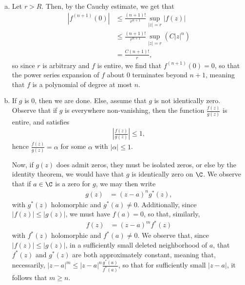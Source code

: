 \documentclass[10pt]{mypackage}
\begin{document}
\begin{solution}\hfill
  \begin{enumerate}[(a)]
    \item Let $r > R$. Then, by the Cauchy estimate, we get that
      \begin{align*}
        \left\vert f^{\left(n+1\right)}(0) \right\vert &\leq \frac{\left( n+1 \right)!}{r^{n+1}}\sup_{|z| = r} \left\vert f(z) \right\vert\\
                                                       &\leq \frac{\left( n+1 \right)!}{r^{n+1}} \sup_{|z| = r} \left( C \left\vert z \right\vert^{n} \right)\\
                                                       &= \frac{C\left( n+1 \right)!}{r},
      \end{align*}
      so since $r$ is arbitrary and $f$ is entire, we find that $ f^{(n+1)}(0) = 0 $, so that the power series expansion of $f$ about $0$ terminates beyond $n + 1$, meaning that $f$ is a polynomial of degree at most $n$.
    \item If $g$ is $0$, then we are done. Else, assume that $g$ is not identically zero. Observe that if $g$ is everywhere non-vanishing, then the function $ \frac{f(z)}{g(z)} $ is entire, and satisfies
      \begin{align*}
        \left\vert \frac{f(z)}{g(z)} \right\vert \leq 1,
      \end{align*}
      hence $ \frac{f(z)}{g(z)} = \alpha $ for some $\alpha$ with $\left\vert \alpha \right\vert \leq 1$.\newline

      Now, if $g(z)$ does admit zeros, they must be isolated zeros, or else by the identity theorem, we would have that $g$ is identically zero on $\C$. We observe that if $a\in \C$ is a zero for $g$, we may then write
      \begin{align*}
        g(z) &= \left( z-a \right)^{n}g^{\ast}\left( z \right),
      \end{align*}
      with $g^{\ast}\left( z \right)$ holomorphic and $g^{\ast}\left( a \right)\neq 0$. Additionally, since $\left\vert f(z) \right\vert \leq \left\vert g(z) \right\vert$, we must have $f(a) = 0$, so that, similarly,
      \begin{align*}
        f(z) &= \left( z-a \right)^{m}f^{\ast}\left( z \right)
      \end{align*}
      with $f^{\ast}\left( z \right)$ holomorphic and $f^{\ast}\left( a \right) \neq 0$. We observe that, since $\left\vert f(z) \right\vert \leq \left\vert g(z) \right\vert$, in a sufficiently small deleted neighborhood of $a$, that $f^{\ast}\left( z \right)$ and $g^{\ast}\left( z \right)$ are both approximately constant, meaning that, necessarily, $\left\vert z-a \right\vert^{m}\leq \left\vert z-a \right\vert^{n} \frac{g^{\ast}\left( a \right)}{f^{\ast}\left( a \right)}$, so that for sufficiently small $\left\vert z-a \right\vert$, it follows that $ m \geq n $.\newline


\end{enumerate}
\end{solution}
\end{document}
